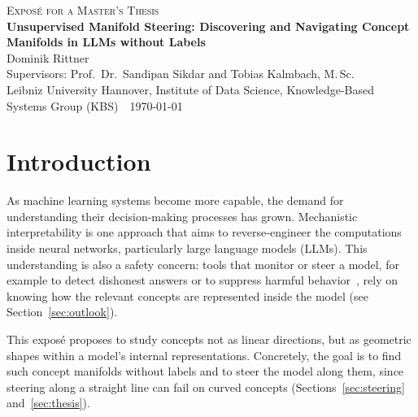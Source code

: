 \documentclass[11pt,a4paper]{article}
\newif\ifdraft
\newcommand{\fromextra}[1]{\textcolor{blue}{#1}}
\newcommand{\fromnotes}[1]{\textcolor{green!50!black}{#1}}
\newcommand{\fromold}[1]{\textcolor{violet}{#1}}
\newcommand{\fromclaude}[1]{\textcolor{orange!85!black}{#1}}
\newcommand{\fromprose}[1]{\textcolor{teal}{#1}}
\newcommand{\fromextra}[1]{#1}
\newcommand{\fromnotes}[1]{#1}
\newcommand{\fromold}[1]{#1}
\newcommand{\fromclaude}[1]{#1}
\newcommand{\fromprose}[1]{#1}
\newcommand{\thesistitle}{Unsupervised Manifold Steering: Discovering and Navigating Concept Manifolds in LLMs without Labels}
\newcommand{\authorname}{Dominik Rittner}
\newcommand{\supervisor}{Prof.\ Dr.\ Sandipan Sikdar and Tobias Kalmbach, M.\,Sc.}
\newcommand{\university}{Leibniz University Hannover, Institute of Data Science, Knowledge-Based Systems Group (KBS)}
\begin{document}
\begin{center}
  {\small\scshape Exposé for a Master's Thesis}\\[0.4ex]
  {\Large\bfseries \thesistitle}\\[0.8ex]
  \authorname\\
  Supervisors: \supervisor\\
  \university\ \textbullet\ \today
\end{center}

\ifdraft
{\small\noindent\textit{Draft legend:} black = Structure.md reading notes;
\fromextra{blue = from the papers, not in the notes};
\fromnotes{green = other notes in the vault};
\fromold{purple = moved from old\_expose.tex};
\fromclaude{orange = added by Claude after your approval};
\fromprose{teal = connecting text added by Claude for the prose}.\par}
\fi




\section{Introduction}
As machine learning systems become more capable, the demand for understanding their decision-making processes has grown. Mechanistic interpretability is one approach that aims to reverse-engineer the computations inside neural networks, particularly large language models (LLMs).
This understanding is also a safety concern: tools that monitor or steer a model, for example to detect dishonest answers or to suppress harmful behavior~\cite{zou2023representation}, rely on knowing how the relevant concepts are represented inside the model \fromclaude{(see Section~\ref{sec:outlook})}.

This exposé proposes to study concepts not as linear directions, but as geometric shapes within a model's internal representations.
\fromclaude{Concretely, the goal is to find such concept manifolds without labels and to steer the model along them, since steering along a straight line can fail on curved concepts (Sections~\ref{sec:steering} and~\ref{sec:thesis}).}
\end{document}
